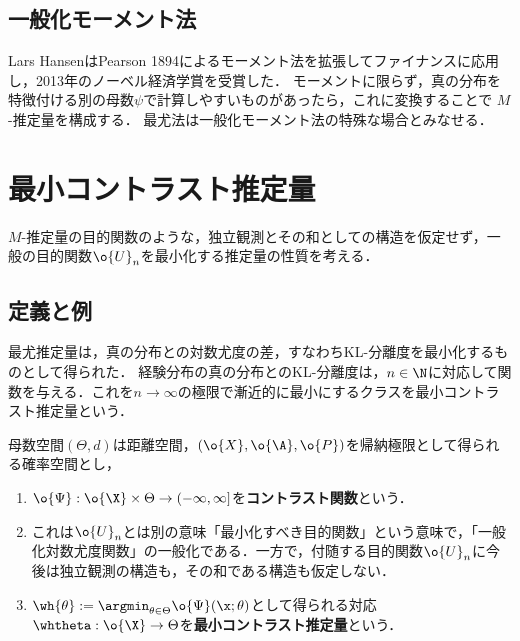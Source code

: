 \documentclass[uplatex,dvipdfmx]{jsreport}
\begin{document}
\subsection{一般化モーメント法}

\begin{tcolorbox}[colframe=ForestGreen, colback=ForestGreen!10!white,breakable,colbacktitle=ForestGreen!40!white,coltitle=black,fonttitle=\bfseries\sffamily,
title=]
    Lars HansenはPearson 1894によるモーメント法を拡張してファイナンスに応用し，2013年のノーベル経済学賞を受賞した．
    モーメントに限らず，真の分布を特徴付ける別の母数$\psi$で計算しやすいものがあったら，これに変換することで
    $M$-推定量を構成する．
    最尤法は一般化モーメント法の特殊な場合とみなせる．
\end{tcolorbox}

\section{最小コントラスト推定量}

\begin{tcolorbox}[colframe=ForestGreen, colback=ForestGreen!10!white,breakable,colbacktitle=ForestGreen!40!white,coltitle=black,fonttitle=\bfseries\sffamily,
title=]
    $M$-推定量の目的関数のような，独立観測とその和としての構造を仮定せず，一般の目的関数$\o{U}_n$を最小化する推定量の性質を考える．
\end{tcolorbox}

\subsection{定義と例}

\begin{tcolorbox}[colframe=ForestGreen, colback=ForestGreen!10!white,breakable,colbacktitle=ForestGreen!40!white,coltitle=black,fonttitle=\bfseries\sffamily,
title=]
    最尤推定量は，真の分布との対数尤度の差，すなわちKL-分離度を最小化するものとして得られた．
    経験分布の真の分布とのKL-分離度は，$n\in\N$に対応して関数を与える．これを$n\to\infty$の極限で漸近的に最小にするクラスを最小コントラスト推定量という．
\end{tcolorbox}

\begin{model}[最小コントラスト推定量が構成可能な模型]\label{model-for-minimum-contrast-estimator}
    母数空間$(\Theta,d)$は距離空間，$(\o{X},\o{\A},\o{P})$を帰納極限として得られる確率空間とし，
    \begin{enumerate}
        \item $\o{\Psi}:\o{\X}\times\Theta\to(-\infty,\infty]$を\textbf{コントラスト関数}という．
        \item これは$\o{U}_n$とは別の意味「最小化すべき目的関数」という意味で，「一般化対数尤度関数」の一般化である．一方で，付随する目的関数$\o{U}_n$に今後は独立観測の構造も，その和である構造も仮定しない．
        \item $\wh{\theta}:=\argmin_{\theta\in\Theta}\o{\Psi}(\x;\theta)$として得られる対応$\whtheta:\o{\X}\to\Theta$を\textbf{最小コントラスト推定量}という．
    \end{enumerate}
\end{model}
\end{document}
